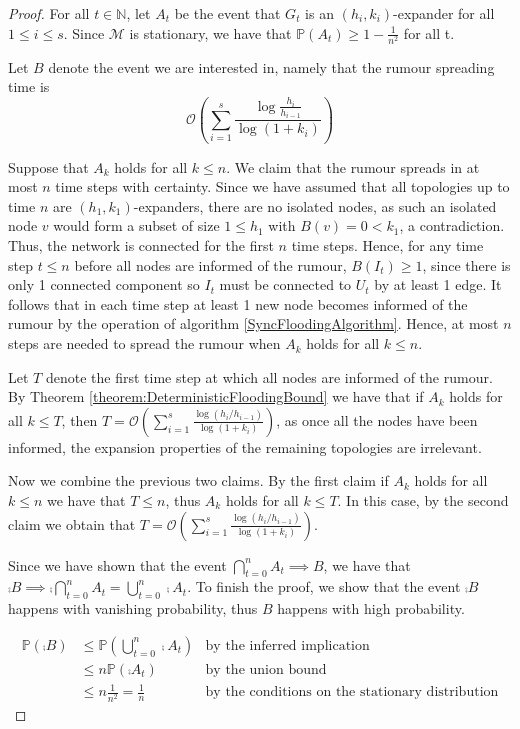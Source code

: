 \begin{proof}
	For all $t \in \mathbb{N}$, let $A_t$ be the event that $G_t$ is an $(h_i, k_i)$-expander for all $1 \leq i \leq s$. Since $\mathcal{M}$ is stationary, we have that $\mathbb{P}(A_t) \geq 1 - \frac{1}{n^2}$ for all t. 

	Let $B$ denote the event we are interested in, namely that the rumour spreading time is 	
	$$
		\mathcal{O}\left(\sum_{i=1}^s \frac{\log \frac{h_i}{h_{i-1}}}{\log(1+k_i)}\right)
	$$

	Suppose that $A_k$ holds for all $k \leq n$. We claim that the rumour spreads in at most $n$ time steps with certainty. Since we have assumed that all topologies up to time $n$ are $(h_1, k_1)$-expanders, there are no isolated nodes, as such an isolated node $v$ would form a subset of size $1 \leq h_1$ with $B({v}) = 0 < k_1$, a contradiction. Thus, the network is connected for the first $n$ time steps. Hence, for any time step $t \leq n$ before all nodes are informed of the rumour, $B(I_t) \geq 1$, since there is only 1 connected component so $I_t$ must be connected  to $U_t$ by at least 1 edge. It follows that in each time step at least 1 new node becomes informed of the rumour by the operation of algorithm \ref{SyncFloodingAlgorithm}. Hence, at most $n$ steps are needed to spread the rumour when $A_k$ holds for all $k \leq n$. 

	Let $T$ denote the first time step at which all nodes are informed of the rumour. By Theorem \ref{theorem:DeterministicFloodingBound} we have that if $A_k$ holds for all $k \leq T$, then $T=\mathcal{O}\left(\sum_{i=1}^s \frac{\log (h_i/h_{i-1})}{\log(1+k_i)}\right)$, as once all the nodes have been informed, the expansion properties of the remaining topologies are irrelevant.

	Now we combine the previous two claims. By the first claim if $A_k$ holds for all $k \leq n$ we have that $T \leq n$, thus $A_k$ holds for all $k \leq T$. In this case, by the second claim we obtain that  $T=\mathcal{O}\left(\sum_{i=1}^s \frac{\log (h_i/h_{i-1})}{\log(1+k_i)}\right)$.

	Since we have shown that the event $\bigcap_{t=0}^n A_t \implies B$, we have that $\comp{B} \implies \comp{ \bigcap_{t=0}^n A_t} = \bigcup_{t=0}^n \comp{A_t}$. To finish the proof, we show that the event $\comp{B}$ happens with vanishing probability, thus $B$ happens with high probability.

	\begin{align*}
		\mathbb{P}(\comp{B}) &\leq \mathbb{P}(\bigcup_{t=0}^n \comp{A_t}) & \text{by the inferred implication} \\ 
		& \leq n \mathbb{P}(\comp{A_t}) & \text{by the union bound}\\ 
		& \leq n \frac{1}{n^2} = \frac{1}{n} & \text{by the conditions on the stationary distribution}
	\end{align*}


\end{proof}

